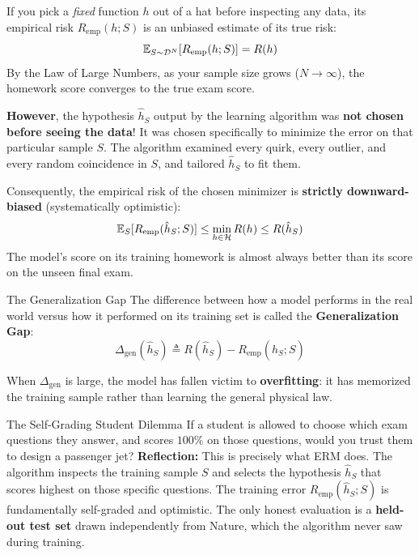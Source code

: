 If you pick a \emph{fixed} function $h$ out of a hat before inspecting any data, its empirical risk $R_{\text{emp}}(h; S)$ is an unbiased estimate of its true risk:
\begin{equation}
\operatorname{\mathbb{E}}_{S \sim \mathcal{D}^N} [R_{\text{emp}}(h; S)] = R(h)
\end{equation}
By the Law of Large Numbers, as your sample size grows ($N \to \infty$), the homework score converges to the true exam score.

\textbf{However}, the hypothesis $\hat{h}_S$ output by the learning algorithm was \textbf{not chosen before seeing the data}! It was chosen specifically to minimize the error on that particular sample $S$. The algorithm examined every quirk, every outlier, and every random coincidence in $S$, and tailored $\hat{h}_S$ to fit them.

Consequently, the empirical risk of the chosen minimizer is \textbf{strictly downward-biased} (systematically optimistic):
\begin{equation}
\operatorname{\mathbb{E}}_S [R_{\text{emp}}(\hat{h}_S; S)] \le \min_{h \in \mathcal{H}} R(h) \le R(\hat{h}_S)
\end{equation}
The model's score on its training homework is almost always better than its score on the unseen final exam.

\begin{definitionbox}{The Generalization Gap}
The difference between how a model performs in the real world versus how it performed on its training set is called the \textbf{Generalization Gap}:
\begin{equation}
\Delta_{\text{gen}}(\hat{h}_S) \triangleq R(\hat{h}_S) - R_{\text{emp}}(\hat{h}_S; S)
\label{eq:generalization_gap_def_ped}
\end{equation}
\end{definitionbox}
When $\Delta_{\text{gen}}$ is large, the model has fallen victim to \textbf{overfitting}: it has memorized the training sample rather than learning the general physical law.

\begin{ponderbox}{The Self-Grading Student Dilemma}
If a student is allowed to choose which exam questions they answer, and scores $100\%$ on those questions, would you trust them to design a passenger jet?
\tcblower
\textbf{Reflection:} This is precisely what ERM does. The algorithm inspects the training sample $S$ and selects the hypothesis $\hat{h}_S$ that scores highest on those specific questions. The training error $R_{\text{emp}}(\hat{h}_S; S)$ is fundamentally self-graded and optimistic. The only honest evaluation is a \textbf{held-out test set} drawn independently from Nature, which the algorithm never saw during training.
\end{ponderbox}

